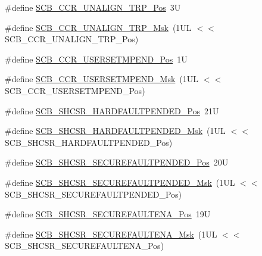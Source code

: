 \begin{DoxyCompactItemize}
\item 
\#define \mbox{\hyperlink{group___c_m_s_i_s___s_c_b_gac4e4928b864ea10fc24dbbc57d976229}{S\+C\+B\+\_\+\+C\+C\+R\+\_\+\+U\+N\+A\+L\+I\+G\+N\+\_\+\+T\+R\+P\+\_\+\+Pos}}~3U
\item 
\#define \mbox{\hyperlink{group___c_m_s_i_s___s_c_b_ga68c96ad594af70c007923979085c99e0}{S\+C\+B\+\_\+\+C\+C\+R\+\_\+\+U\+N\+A\+L\+I\+G\+N\+\_\+\+T\+R\+P\+\_\+\+Msk}}~(1\+U\+L $<$$<$ S\+C\+B\+\_\+\+C\+C\+R\+\_\+\+U\+N\+A\+L\+I\+G\+N\+\_\+\+T\+R\+P\+\_\+\+Pos)
\item 
\#define \mbox{\hyperlink{group___c_m_s_i_s___s_c_b_ga789e41f45f59a8cd455fd59fa7652e5e}{S\+C\+B\+\_\+\+C\+C\+R\+\_\+\+U\+S\+E\+R\+S\+E\+T\+M\+P\+E\+N\+D\+\_\+\+Pos}}~1U
\item 
\#define \mbox{\hyperlink{group___c_m_s_i_s___s_c_b_ga4cf59b6343ca962c80e1885710da90aa}{S\+C\+B\+\_\+\+C\+C\+R\+\_\+\+U\+S\+E\+R\+S\+E\+T\+M\+P\+E\+N\+D\+\_\+\+Msk}}~(1\+U\+L $<$$<$ S\+C\+B\+\_\+\+C\+C\+R\+\_\+\+U\+S\+E\+R\+S\+E\+T\+M\+P\+E\+N\+D\+\_\+\+Pos)
\item 
\#define \mbox{\hyperlink{group___c_m_s_i_s___s_c_b_ga2e86fa5b7279235de3a62839e3f147cb}{S\+C\+B\+\_\+\+S\+H\+C\+S\+R\+\_\+\+H\+A\+R\+D\+F\+A\+U\+L\+T\+P\+E\+N\+D\+E\+D\+\_\+\+Pos}}~21U
\item 
\#define \mbox{\hyperlink{group___c_m_s_i_s___s_c_b_gad72747c81f58f73f0610760529697297}{S\+C\+B\+\_\+\+S\+H\+C\+S\+R\+\_\+\+H\+A\+R\+D\+F\+A\+U\+L\+T\+P\+E\+N\+D\+E\+D\+\_\+\+Msk}}~(1\+U\+L $<$$<$ S\+C\+B\+\_\+\+S\+H\+C\+S\+R\+\_\+\+H\+A\+R\+D\+F\+A\+U\+L\+T\+P\+E\+N\+D\+E\+D\+\_\+\+Pos)
\item 
\#define \mbox{\hyperlink{group___c_m_s_i_s___s_c_b_ga39d60110521af453e9ae55f1a29d2ab4}{S\+C\+B\+\_\+\+S\+H\+C\+S\+R\+\_\+\+S\+E\+C\+U\+R\+E\+F\+A\+U\+L\+T\+P\+E\+N\+D\+E\+D\+\_\+\+Pos}}~20U
\item 
\#define \mbox{\hyperlink{group___c_m_s_i_s___s_c_b_ga504f2af763a6f491acaba1912d5fe702}{S\+C\+B\+\_\+\+S\+H\+C\+S\+R\+\_\+\+S\+E\+C\+U\+R\+E\+F\+A\+U\+L\+T\+P\+E\+N\+D\+E\+D\+\_\+\+Msk}}~(1\+U\+L $<$$<$ S\+C\+B\+\_\+\+S\+H\+C\+S\+R\+\_\+\+S\+E\+C\+U\+R\+E\+F\+A\+U\+L\+T\+P\+E\+N\+D\+E\+D\+\_\+\+Pos)
\item 
\#define \mbox{\hyperlink{group___c_m_s_i_s___s_c_b_gafccb0c2b386b439ce03fb25ce3392ffc}{S\+C\+B\+\_\+\+S\+H\+C\+S\+R\+\_\+\+S\+E\+C\+U\+R\+E\+F\+A\+U\+L\+T\+E\+N\+A\+\_\+\+Pos}}~19U
\item 
\#define \mbox{\hyperlink{group___c_m_s_i_s___s_c_b_ga2bb1374f777b18501bb0c7b7b1a775aa}{S\+C\+B\+\_\+\+S\+H\+C\+S\+R\+\_\+\+S\+E\+C\+U\+R\+E\+F\+A\+U\+L\+T\+E\+N\+A\+\_\+\+Msk}}~(1\+U\+L $<$$<$ S\+C\+B\+\_\+\+S\+H\+C\+S\+R\+\_\+\+S\+E\+C\+U\+R\+E\+F\+A\+U\+L\+T\+E\+N\+A\+\_\+\+Pos)
$$
\end{DoxyCompactItemize}

